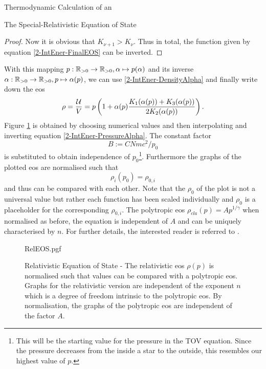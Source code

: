 \begin{section}{Thermodynamic Calculation of an }
\begin{subsection}{The Special-Relativistic Equation of State}
\begin{proof}
	Now it is obvious that $K_{\nu+1}>K_\nu$.
	Thus in total, the function given by equation \eqref{2-IntEner-FinalEOS} can be inverted.
\end{proof}%
%
%
\noindent With this mapping $p:\mathbb{R}_{>0}\rightarrow \mathbb{R}_{>0},\alpha\mapsto p(\alpha)$ and its inverse $\alpha:\mathbb{R}_{>0}\rightarrow \mathbb{R}_{>0},p\mapsto \alpha(p)$, we can use \eqref{2-IntEner-DensityAlpha} and finally write down the \ac{eos} 
\begin{equation}
	\rho = \frac{\mathcal{U}}{V} = p\left(1+\alpha(p)\frac{K_1(\alpha(p))+K_3(\alpha(p))}{2K_2(\alpha(p))}\right).
	\label{2-IntEner-FinalEOS}
\end{equation}
Figure \ref{2-IntEner-RelEOSPlot} is obtained by choosing numerical values and then interpolating and inverting equation \eqref{2-IntEner-PressureAlpha}.
The constant factor
\begin{equation}
	B:=CNmc^2/p_0
	\label{2-IntEner-FactorExplanation}
\end{equation}
is substituted to obtain independence of $p_0$\footnote{This will be the starting value for the pressure in the \acl{TOV} equation. Since the pressure decreases from the inside a star to the outside, this resembles our highest value of $p$.}.
Furthermore the graphs of the plotted \ac{eos} are normalised such that
\begin{equation}
	\rho_{i}(p_0)=\rho_{0,i}
\end{equation}
and thus can be compared with each other.
Note that the $\rho_0$ of the plot is not a universal value but rather each function has been scaled individually and $\rho_0$ is a placeholder for the corresponding $\rho_{0,i}$.
The polytropic \ac{eos} $\rho_{cla}(p)=Ap^{1/\gamma}$ when normalised as before, the equation is independent of $A$ and can be uniquely characterised by $n$. %
For further details, the interested reader is referred to \cite{pleyerGithubRepositoryJonas2021}.
\begin{figure}[H]
	\centering
	{RelEOS.pgf}
	\caption[Relativistic Equation of State]{Relativistic Equation of State -
	The relativistic \ac{eos} $\rho(p)$ is normalised such that values can be compared with a polytropic \ac{eos}.
	Graphs for the relativistic version are independent of the exponent $n$ which is a degree of freedom intrinsic to the polytropic \ac{eos}.
	By normalisation, the graphs of the polytropic \ac{eos} are independent of the factor $A$.}
	\label{2-IntEner-RelEOSPlot}
\end{figure}
\end{subsection}
%
%
%
%
%
%
\end{section}
